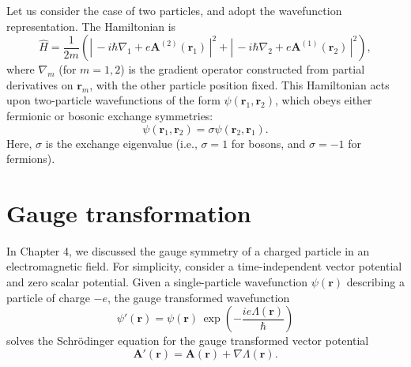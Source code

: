 \documentclass[pra,12pt]{revtex4}
\begin{document}
Let us consider the case of two particles, and adopt the wavefunction
representation.  The Hamiltonian is
\begin{equation}
  \hat{H} = \frac{1}{2m} \left( \left| \, -i\hbar \nabla_1
  + e\mathbf{A}^{(2)}(\mathbf{r}_1)\,\right|^2
  + \left| \, -i\hbar \nabla_2
  + e\mathbf{A}^{(1)}(\mathbf{r}_2)\,\right|^2\right),
  \label{HamA}
\end{equation}
where $\nabla_m$ (for $m = 1,2$) is the gradient operator constructed
from partial derivatives on $\mathbf{r}_m$, with the other particle
position fixed.  This Hamiltonian acts upon two-particle wavefunctions
of the form $\psi(\mathbf{r}_1, \mathbf{r}_2)$, which obeys either
fermionic or bosonic exchange symmetries:
\begin{equation}
  \psi(\mathbf{r}_1, \mathbf{r}_2) = \sigma \psi(\mathbf{r}_2, \mathbf{r}_1).
  \label{exchange}
\end{equation}
Here, $\sigma$ is the exchange eigenvalue (i.e., $\sigma = 1$ for
bosons, and $\sigma = -1$ for fermions).

\section{Gauge transformation}

In Chapter 4, we discussed the gauge symmetry of a charged particle in
an electromagnetic field.  For simplicity, consider a time-independent
vector potential and zero scalar potential.  Given a single-particle
wavefunction $\psi(\mathbf{r})$ describing a particle of charge $-e$,
the gauge transformed wavefunction
\begin{equation}
  \psi'(\mathbf{r}) = \psi(\mathbf{r}) \,
  \exp\!\left(-\frac{ie\Lambda(\mathbf{r})}{\hbar}\right)
\end{equation}
solves the Schr\"odinger equation for the gauge transformed vector
potential
\begin{equation*}
  \mathbf{A}'(\mathbf{r}) = \mathbf{A}(\mathbf{r}) + \nabla \Lambda(\mathbf{r}).
\end{equation*}
\end{document}
